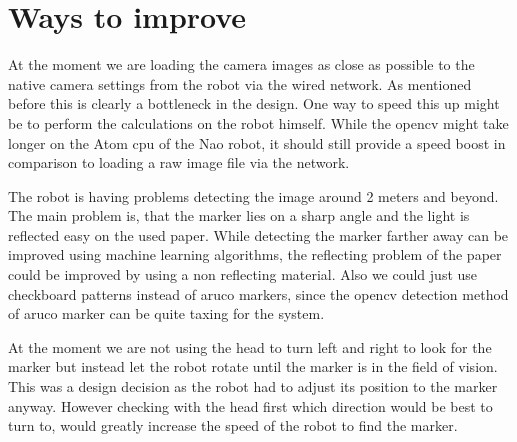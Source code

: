\documentclass{article}
\begin{document}
\section{Ways to improve}
At the moment we are loading the camera images as close as possible to the native camera settings from the robot via the wired network. As mentioned before this is clearly a bottleneck in the design. One way to speed this up might be to perform the calculations on the robot himself. While the opencv might take longer on the Atom cpu of the Nao robot, it should still provide a speed boost in comparison to loading a raw image file via the network.

The robot is having problems detecting the image around 2 meters and beyond. The main problem is, that the marker lies on a sharp angle and the light is reflected easy on the used paper. While detecting the marker farther away can be improved using machine learning algorithms, the reflecting problem of the paper could be improved by using a non reflecting material. Also we could just use checkboard patterns instead of aruco markers, since the opencv detection method of aruco marker can be quite taxing for the system.

At the moment we are not using the head to turn left and right to look for the marker but instead let the robot rotate until the marker is in the field of vision. This was a design decision as the robot had to adjust its position to the marker anyway. However checking with the head first which direction would be best to turn to, would greatly increase the speed of the robot to find the marker.
\end{document}
